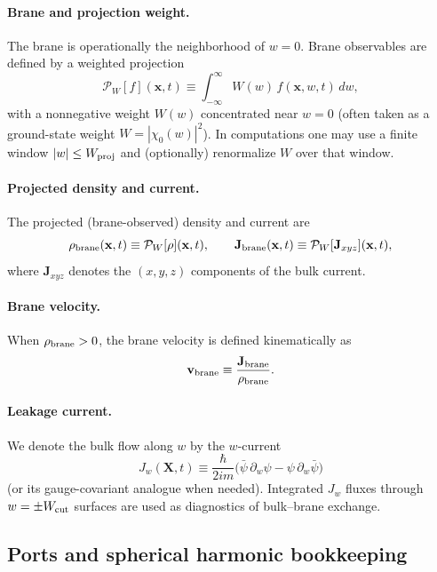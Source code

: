 \documentclass[11pt]{article}
\begin{document}
\paragraph{Brane and projection weight.}
The brane is operationally the neighborhood of $w=0$. Brane observables are defined by a weighted projection
\begin{equation}
  \mathcal P_W[f](\mathbf x,t) \equiv \int_{-\infty}^{\infty} W(w)\,f(\mathbf x,w,t)\,dw,
\end{equation}
with a nonnegative weight $W(w)$ concentrated near $w=0$ (often taken as a ground-state weight
$W=|\chi_0(w)|^2$). In computations one may use a finite window $|w|\le W_{\rm proj}$ and (optionally) renormalize
$W$ over that window.

\paragraph{Projected density and current.}
The projected (brane-observed) density and current are
\begin{equation}
  \rho_{\rm brane}(\mathbf x,t) \equiv \mathcal P_W[\rho](\mathbf x,t),
  \qquad
  \mathbf J_{\rm brane}(\mathbf x,t) \equiv \mathcal P_W[\mathbf J_{xyz}](\mathbf x,t),
\end{equation}
where $\mathbf J_{xyz}$ denotes the $(x,y,z)$ components of the bulk current.

\paragraph{Brane velocity.}
When $\rho_{\rm brane}>0$, the brane velocity is defined kinematically as
\begin{equation}
  \mathbf v_{\rm brane} \equiv \frac{\mathbf J_{\rm brane}}{\rho_{\rm brane}}.
\end{equation}

\paragraph{Leakage current.}
We denote the bulk flow along $w$ by the $w$-current
\begin{equation}
  J_w(\mathbf X,t) \equiv \frac{\hbar}{2im}\Big(\bar\psi\,\partial_w\psi-\psi\,\partial_w\bar\psi\Big)
\end{equation}
(or its gauge-covariant analogue when needed). Integrated $J_w$ fluxes through $w=\pm W_{\rm cut}$ surfaces
are used as diagnostics of bulk--brane exchange.

\subsection{Ports and spherical harmonic bookkeeping}
\end{document}
